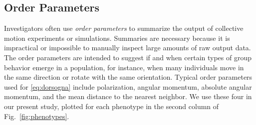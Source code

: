 \documentclass[%
 aip,
reprint,
 amsmath,amssymb,
 aps,
showkeys
]{revtex4-1}
\begin{document}
\subsection{Order Parameters}\label{subsec:op}

Investigators often use \emph{order parameters} to summarize the output of collective motion experiments or simulations. \cite{CouKraJam2002,DorChuBer2006,TopZieHal2015} Summaries are necessary because it is impractical or impossible to manually inspect large amounts of raw output data. The order parameters are intended to suggest if and when certain types of group behavior emerge in a population, for instance, when many individuals move in the same direction or rotate with the same orientation. Typical order parameters used for \eqref{eq:dorsogna} include polarization, angular momentum, absolute angular momentum, and the mean distance to the nearest neighbor\cite{TopZieHal2015}. We use these four in our present study, plotted for each phenotype in the second column of Fig.~\ref{fig:phenotypes}.  
\end{document}
